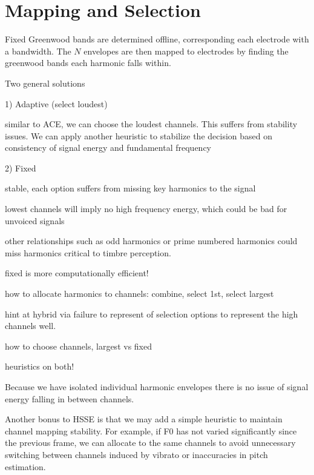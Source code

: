 \documentclass [11pt, proquest,oneside] {uwthesis}[2015/03/03]
\begin{document}
\section{Mapping and Selection}

Fixed Greenwood bands are determined offline, corresponding each electrode with a bandwidth.  The $N$ envelopes are then mapped to electrodes by finding the greenwood bands each harmonic falls within.

Two general solutions

1) Adaptive (select loudest)

similar to ACE, we can choose the loudest channels.  This suffers from stability issues.  We can apply another heuristic to stabilize the decision based on consistency of signal energy and fundamental frequency

2) Fixed

stable, each option suffers from missing key harmonics to the signal

lowest channels will imply no high frequency energy, which could be bad for unvoiced signals

other relationships such as odd harmonics or prime numbered harmonics could miss harmonics critical to timbre perception.

fixed is more computationally efficient!


how to allocate harmonics to channels: combine, select 1st, select largest

hint at hybrid via failure to represent of selection options to represent the high channels well.

how to choose channels, largest vs fixed

heuristics on both!

Because we have isolated individual harmonic envelopes there is no issue of signal energy falling in between channels.

Another bonus to HSSE is that we may add a simple heuristic to maintain channel mapping stability.  For example, if F0 has not varied significantly since the previous frame, we can allocate to the same channels to avoid unnecessary switching between channels induced by vibrato or inaccuracies in pitch estimation.



\end{document}
